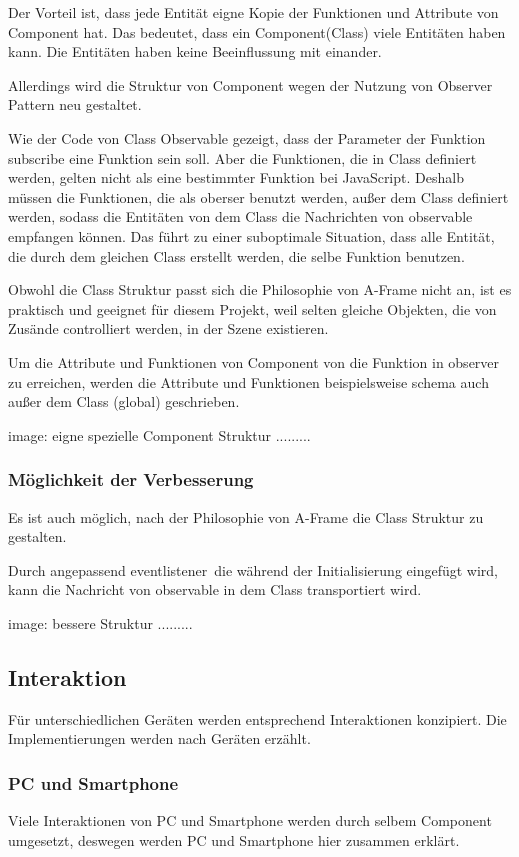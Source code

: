  Der Vorteil ist, dass jede Entität eigne Kopie der Funktionen und Attribute von Component hat. Das bedeutet, dass ein Component(Class) viele Entitäten haben kann. Die Entitäten haben keine Beeinflussung mit einander.
 
 Allerdings wird die Struktur von Component wegen der Nutzung von Observer Pattern neu gestaltet.
 
 Wie der Code von Class Observable gezeigt, dass der Parameter der Funktion subscribe eine Funktion sein soll. Aber die Funktionen, die in Class definiert werden, gelten nicht als eine bestimmter Funktion bei JavaScript. Deshalb müssen die Funktionen, die als oberser benutzt werden, außer dem Class definiert werden, sodass die Entitäten von dem Class die Nachrichten von observable empfangen können. Das führt zu einer suboptimale Situation, dass alle Entität, die durch dem gleichen Class erstellt werden, die selbe Funktion benutzen.
 
 Obwohl die Class Struktur passt sich die Philosophie von A-Frame nicht an, ist es praktisch und geeignet für diesem Projekt, weil selten gleiche Objekten, die von Zusände controlliert werden, in der Szene existieren.
 
 Um die Attribute und Funktionen von Component von die Funktion in observer zu erreichen, werden die Attribute und Funktionen beispielsweise schema auch außer dem Class (global) geschrieben.
 
 image: eigne spezielle Component Struktur .........
 
 \subsubsection{Möglichkeit der Verbesserung}
 Es ist auch möglich, nach der Philosophie von A-Frame die Class Struktur zu gestalten.
 
 Durch angepassend \glqq eventlistener\grqq\, die während der Initialisierung eingefügt wird, kann die Nachricht von observable in dem Class transportiert wird.
 
 image: bessere Struktur .........
 
 \subsection{Interaktion}
  Für unterschiedlichen Geräten werden entsprechend Interaktionen konzipiert. Die Implementierungen werden nach Geräten erzählt.
  \subsubsection{PC und Smartphone}
  Viele Interaktionen von PC und Smartphone werden durch selbem Component umgesetzt, deswegen werden PC und Smartphone hier zusammen erklärt.
  
